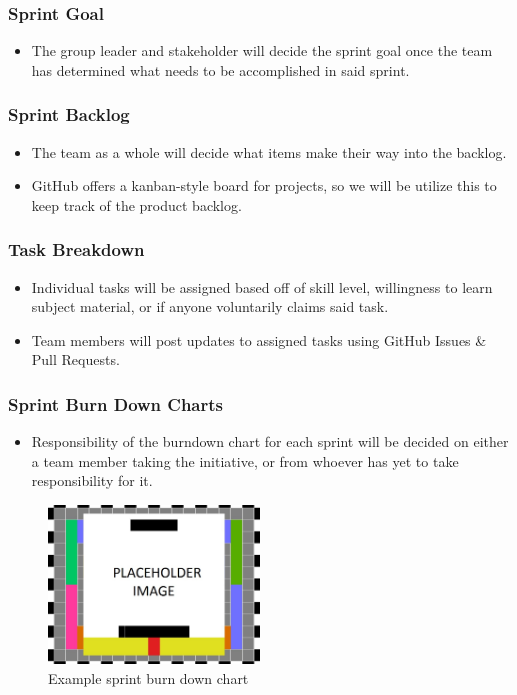 \subsubsection{Sprint Goal}
\begin{itemize}
  \item The group leader and stakeholder will decide the sprint goal once the team has determined what needs to be accomplished in said sprint.
\end{itemize}

\subsubsection{Sprint Backlog}
\begin{itemize}
  \item The team as a whole will decide what items make their way into the backlog.
  \item GitHub offers a kanban-style board for projects, so we will be utilize this to keep track of the product backlog.
\end{itemize}

\subsubsection{Task Breakdown}
\begin{itemize}
  \item Individual tasks will be assigned based off of skill level, willingness to learn subject material, or if anyone voluntarily claims said task.
  \item Team members will post updates to assigned tasks using GitHub Issues \& Pull Requests.
\end{itemize}

\subsubsection{Sprint Burn Down Charts}
\begin{itemize}
  \item Responsibility of the burndown chart for each sprint will be decided on either a team member taking the initiative, or from whoever has yet to take responsibility for it.
\end{itemize}

\begin{figure}[h!]
    \centering
    \includegraphics[width=0.5\textwidth]{images/test_image}
    \caption{Example sprint burn down chart}
\end{figure}

